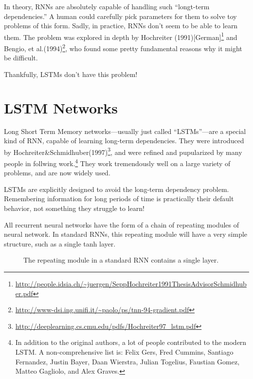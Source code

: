\documentclass[12pt]{article} %
\begin{document}
In theory, RNNs are absolutely capable of handling such ``longt-term dependencies.'' A human could carefully pick parameters for them to solve toy problems of this form.  Sadly, in practice, RNNs don't seem to be able to learn them. The problem was explored in depth by  Hochreiter (1991)[German]\footnote{\url{http://people.idsia.ch/~juergen/SeppHochreiter1991ThesisAdvisorSchmidhuber.pdf}} and Bengio, et al.(1994)\footnote{\url{http://www-dsi.ing.unifi.it/~paolo/ps/tnn-94-gradient.pdf}}, who found some pretty fundamental reasons why it might be difficult.

Thankfully, LSTMs don't have this problem!

\section{LSTM Networks}

Long Short Term Memory networks---usually just called ``LSTMs''---are a special kind of RNN, capable of learning long-term dependencies. They were introduced by Hochreiter\&Schmidhuber(1997)\footnote{\url{http://deeplearning.cs.cmu.edu/pdfs/Hochreiter97\_lstm.pdf}}, and were refined and pupularized by many people in follwing work.\footnote{In addition to the original authors, a lot of people contributed to the modern LSTM. A non-comprehensive list is: Felix Gers, Fred Cummins, Santiago Fernandez, Justin Bayer, Daan Wierstra, Julian Togelius, Faustian Gomez, Matteo Gagliolo, and Alex Graves.} They work tremendously well on a large variety of problems, and are now widely used.

LSTMs are explicitly designed to avoid the long-term dependency problem. Remembering information for long periods of time is practically their default behavior, not something they struggle to learn!

All recurrent neural networks have the form of a chain of repeating modules of neural network. In standard RNNs, this repeating module will have a very simple structure, such as a single tanh layer.

\begin{figure}[H] %
\caption{The repeating module in a standard RNN contains a single layer.}
\label{fig:rnnunrolled}
\end{figure}
\end{document}
